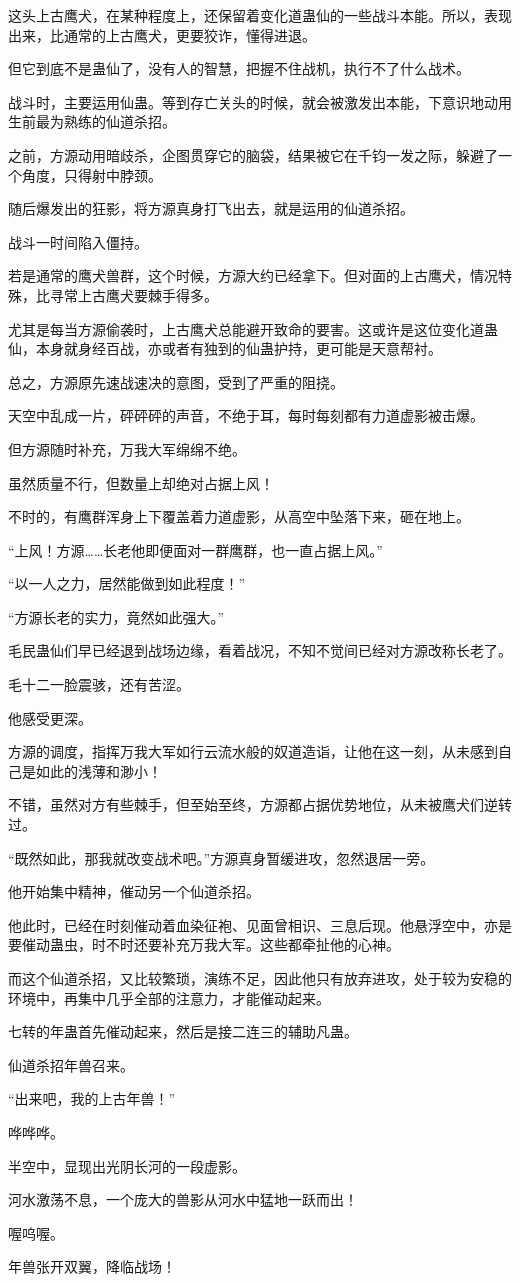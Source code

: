 \begin{this_body}
这头上古鹰犬，在某种程度上，还保留着变化道蛊仙的一些战斗本能。所以，表现出来，比通常的上古鹰犬，更要狡诈，懂得进退。

但它到底不是蛊仙了，没有人的智慧，把握不住战机，执行不了什么战术。

战斗时，主要运用仙蛊。等到存亡关头的时候，就会被激发出本能，下意识地动用生前最为熟练的仙道杀招。

之前，方源动用暗歧杀，企图贯穿它的脑袋，结果被它在千钧一发之际，躲避了一个角度，只得射中脖颈。

随后爆发出的狂影，将方源真身打飞出去，就是运用的仙道杀招。

战斗一时间陷入僵持。

若是通常的鹰犬兽群，这个时候，方源大约已经拿下。但对面的上古鹰犬，情况特殊，比寻常上古鹰犬要棘手得多。

尤其是每当方源偷袭时，上古鹰犬总能避开致命的要害。这或许是这位变化道蛊仙，本身就身经百战，亦或者有独到的仙蛊护持，更可能是天意帮衬。

总之，方源原先速战速决的意图，受到了严重的阻挠。

天空中乱成一片，砰砰砰的声音，不绝于耳，每时每刻都有力道虚影被击爆。

但方源随时补充，万我大军绵绵不绝。

虽然质量不行，但数量上却绝对占据上风！

不时的，有鹰群浑身上下覆盖着力道虚影，从高空中坠落下来，砸在地上。

“上风！方源……长老他即便面对一群鹰群，也一直占据上风。”

“以一人之力，居然能做到如此程度！”

“方源长老的实力，竟然如此强大。”

毛民蛊仙们早已经退到战场边缘，看着战况，不知不觉间已经对方源改称长老了。

毛十二一脸震骇，还有苦涩。

他感受更深。

方源的调度，指挥万我大军如行云流水般的奴道造诣，让他在这一刻，从未感到自己是如此的浅薄和渺小！

不错，虽然对方有些棘手，但至始至终，方源都占据优势地位，从未被鹰犬们逆转过。

“既然如此，那我就改变战术吧。”方源真身暂缓进攻，忽然退居一旁。

他开始集中精神，催动另一个仙道杀招。

他此时，已经在时刻催动着血染征袍、见面曾相识、三息后现。他悬浮空中，亦是要催动蛊虫，时不时还要补充万我大军。这些都牵扯他的心神。

而这个仙道杀招，又比较繁琐，演练不足，因此他只有放弃进攻，处于较为安稳的环境中，再集中几乎全部的注意力，才能催动起来。

七转的年蛊首先催动起来，然后是接二连三的辅助凡蛊。

仙道杀招年兽召来。

“出来吧，我的上古年兽！”

哗哗哗。

半空中，显现出光阴长河的一段虚影。

河水激荡不息，一个庞大的兽影从河水中猛地一跃而出！

喔呜喔。

年兽张开双翼，降临战场！

\end{this_body}

